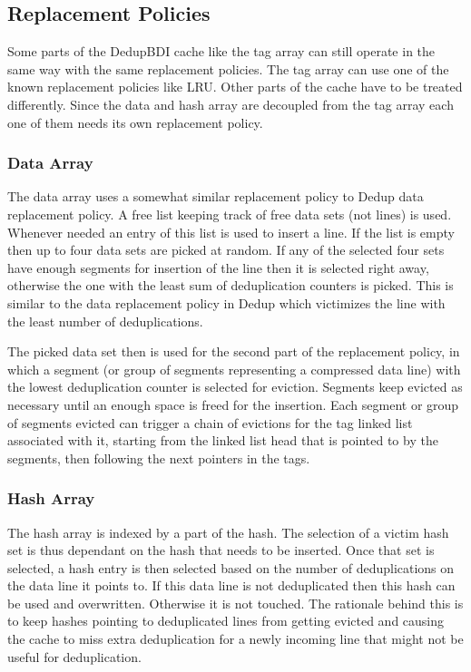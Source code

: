 \subsection{Replacement Policies}
\label{ssec:Replacement Policies}
Some parts of the DedupBDI cache like the tag array can still operate in the same way with the same replacement policies. The tag array can use one of the known replacement policies like LRU. Other parts of the cache have to be treated differently. Since the data and hash array are decoupled from the tag array each one of them needs its own replacement policy.
\subsubsection{Data Array}
\label{sssec:DedupBDIDataRepl}
The data array uses a somewhat similar replacement policy to Dedup data replacement policy. A free list keeping track of free data sets (not lines) is used. Whenever needed an entry of this list is used to insert a line. If the list is empty then up to four data sets are picked at random. If any of the selected four sets have enough segments for insertion of the line then it is selected right away, otherwise the one with the least sum of deduplication counters is picked. This is similar to the data replacement policy in Dedup which victimizes the line with the least number of deduplications.\par
The picked data set then is used for the second part of the replacement policy, in which a segment (or group of segments representing a compressed data line) with the lowest deduplication counter is selected for eviction. Segments keep evicted as necessary until an enough space is freed for the insertion. Each segment or group of segments evicted can trigger a chain of evictions for the tag linked list associated with it, starting from the linked list head that is pointed to by the segments, then following the next pointers in the tags.
\subsubsection{Hash Array}
\label{sssec:DedupBDIHashRepl}
The hash array is indexed by a part of the hash. The selection of a victim hash set is thus dependant on the hash that needs to be inserted. Once that set is selected, a hash entry is then selected based on the number of deduplications on the data line it points to. If this data line is not deduplicated then this hash can be used and overwritten. Otherwise it is not touched. The rationale behind this is to keep hashes pointing to deduplicated lines from getting evicted and causing the cache to miss extra deduplication for a newly incoming line that might not be useful for deduplication.

